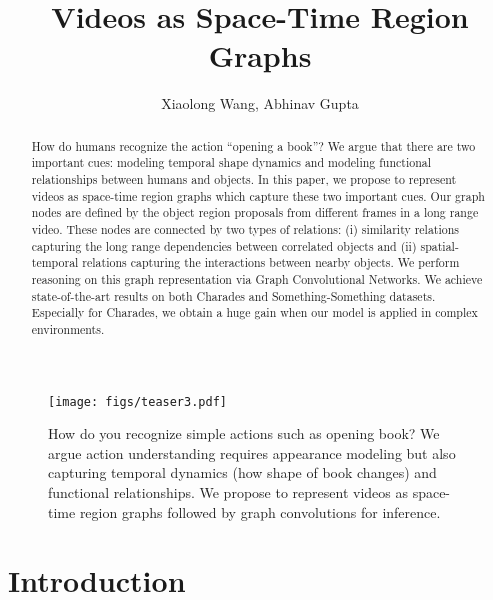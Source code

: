 \documentclass[runningheads]{llncs}
\begin{document}
\pagestyle{headings}
\mainmatter

\title{Videos as Space-Time Region Graphs} 

\author{Xiaolong Wang, Abhinav Gupta}



\maketitle

\begin{figure}
\centering
\texttt{[image: figs/teaser3.pdf]}
\vspace{-0.1in}
\caption{How do you recognize simple actions such as opening book? We argue action understanding requires appearance modeling but also capturing temporal dynamics (how shape of book changes) and functional relationships. We propose to represent videos as space-time region graphs followed by graph convolutions for inference. }
\label{fig:teaser}
\vspace{-1em}
\end{figure}


\begin{abstract}

How do humans recognize the action ``opening a book''? We argue that there are two important cues: modeling temporal shape dynamics and modeling functional relationships between humans and objects. In this paper, we propose to represent videos as space-time region graphs which capture these two important cues. Our graph nodes are defined by the object region proposals from different frames in a long range video. These nodes are connected by two types of relations: (i) similarity relations capturing the long range dependencies between correlated objects and (ii) spatial-temporal relations capturing the interactions between nearby objects. We perform reasoning on this graph representation via Graph Convolutional Networks. We achieve state-of-the-art results on both Charades and Something-Something datasets. Especially for Charades, we obtain a huge  gain when our model is applied in complex environments. 

\end{abstract}


\section{Introduction}
\end{document}
